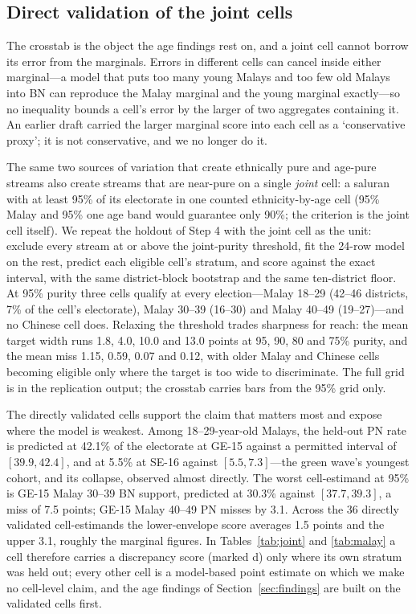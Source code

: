 \documentclass[11pt]{article}
\begin{document}
\subsection{Direct validation of the joint cells}
\label{sec:strategy-jointcells}

The crosstab is the object the age findings rest on, and a joint cell cannot borrow its error from the marginals. Errors in different cells can cancel inside either marginal---a model that puts too many young Malays and too few old Malays into BN can reproduce the Malay marginal and the young marginal exactly---so no inequality bounds a cell's error by the larger of two aggregates containing it. An earlier draft carried the larger marginal score into each cell as a `conservative proxy'; it is not conservative, and we no longer do it.

The same two sources of variation that create ethnically pure and age-pure streams also create streams that are near-pure on a single \emph{joint} cell: a saluran with at least 95\% of its electorate in one counted ethnicity-by-age cell (95\% Malay and 95\% one age band would guarantee only 90\%; the criterion is the joint cell itself). We repeat the holdout of Step 4 with the joint cell as the unit: exclude every stream at or above the joint-purity threshold, fit the 24-row model on the rest, predict each eligible cell's stratum, and score against the exact interval, with the same district-block bootstrap and the same ten-district floor. At 95\% purity three cells qualify at every election---Malay 18--29 (42--46 districts, 7\% of the cell's electorate), Malay 30--39 (16--30) and Malay 40--49 (19--27)---and no Chinese cell does. Relaxing the threshold trades sharpness for reach: the mean target width runs 1.8, 4.0, 10.0 and 13.0 points at 95, 90, 80 and 75\% purity, and the mean miss 1.15, 0.59, 0.07 and 0.12, with older Malay and Chinese cells becoming eligible only where the target is too wide to discriminate. The full grid is in the replication output; the crosstab carries bars from the 95\% grid only.

The directly validated cells support the claim that matters most and expose where the model is weakest. Among 18--29-year-old Malays, the held-out PN rate is predicted at 42.1\% of the electorate at GE-15 against a permitted interval of $[39.9, 42.4]$, and at 5.5\% at SE-16 against $[5.5, 7.3]$---the green wave's youngest cohort, and its collapse, observed almost directly. The worst cell-estimand at 95\% is GE-15 Malay 30--39 BN support, predicted at 30.3\% against $[37.7, 39.3]$, a miss of 7.5 points; GE-15 Malay 40--49 PN misses by 3.1. Across the 36 directly validated cell-estimands the lower-envelope score averages 1.5 points and the upper 3.1, roughly the marginal figures. In Tables~\ref{tab:joint} and \ref{tab:malay} a cell therefore carries a discrepancy score (marked \textsf{d}) only where its own stratum was held out; every other cell is a model-based point estimate on which we make no cell-level claim, and the age findings of Section~\ref{sec:findings} are built on the validated cells first.
\end{document}
